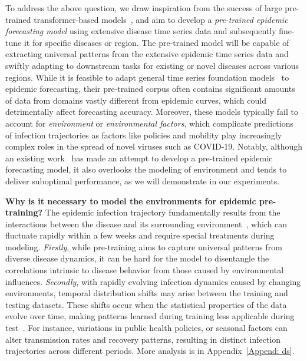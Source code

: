 To address the above question, we draw inspiration from the success of large pre-trained transformer-based models~\cite{zhao2023survey}, and aim to develop a \textit{pre-trained epidemic forecasting model} using extensive disease time series data and subsequently fine-tune it for specific diseases or region. The pre-trained model will be capable of extracting universal patterns from the extensive epidemic time series data and swiftly adapting to downstream tasks for existing or novel diseases across various regions. While it is feasible to adapt general time series foundation models~\cite{liang2024foundation, ma2024survey} to epidemic forecasting, their pre-trained corpus often contains significant amounts of data from domains vastly different from epidemic curves, which could detrimentally affect forecasting accuracy. Moreover, these models typically fail to account for \textit{environment} or \textit{environmental factors}, which complicate predictions of infection trajectories as factors like policies and mobility play increasingly complex roles in the spread of novel viruses such as COVID-19. Notably, although an existing work~\cite{kamarthi2023pems} has made an attempt to develop a pre-trained epidemic forecasting model, it also overlooks the modeling of environment and tends to deliver suboptimal performance, as we will demonstrate in our experiments.




\textbf{Why is it necessary to model the environments for epidemic pre-training?} 
The epidemic infection trajectory fundamentally results from the interactions between the disease and its surrounding environment~\cite{jutla2013environmental}, which can fluctuate rapidly within a few weeks and require special treatments during modeling. \textit{Firstly}, while pre-training aims to capture universal patterns from diverse disease dynamics, it can be hard for the model to disentangle the correlations intrinsic to disease behavior from those caused by environmental influences. \textit{Secondly}, with rapidly evolving infection dynamics caused by changing environments, temporal distribution shifts may arise between the training and testing datasets. These shifts occur when the statistical properties of the data evolve over time, making patterns learned during training less applicable during test~\cite{chen2024calibration, zhang2022dynamic}. For instance, variations in public health policies, or seasonal factors can alter transmission rates and recovery patterns, resulting in distinct infection trajectories across different periods. More analysis is in Appendix~\ref{Append: ds}.



